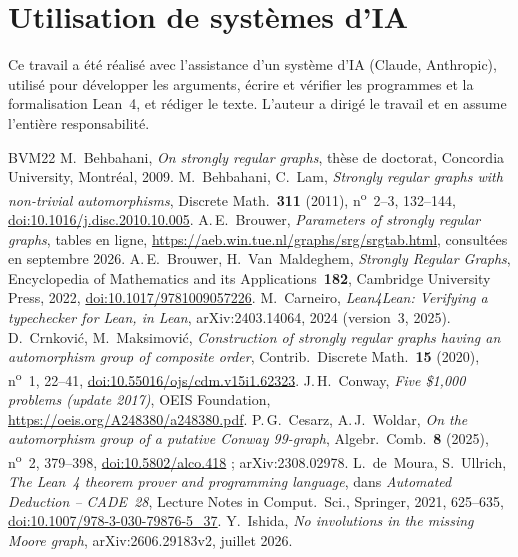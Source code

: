 \documentclass[11pt,a4paper]{article}
\theoremstyle{remark}
\begin{document}
{\small\raggedright
\section*{Utilisation de systèmes d'IA}
Ce travail a été réalisé avec l'assistance d'un système d'IA (Claude, Anthropic), utilisé pour développer les
arguments, écrire et vérifier les programmes et la formalisation Lean~4, et rédiger le texte. L'auteur a dirigé le
travail et en assume l'entière responsabilité.

\begin{thebibliography}{BVM22}
 M.~Behbahani, \emph{On strongly regular graphs}, thèse de doctorat, Concordia University, Montréal, 2009.
 M.~Behbahani, C.~Lam, \emph{Strongly regular graphs with non-trivial automorphisms}, Discrete Math.\
\textbf{311} (2011), n\textsuperscript{o}~2--3, 132--144,
\href{https://doi.org/10.1016/j.disc.2010.10.005}{doi:10.1016/j.disc.2010.10.005}.
\bibitem[Br]{Br} A.\,E.~Brouwer, \emph{Parameters of strongly regular graphs}, tables en ligne,
\url{https://aeb.win.tue.nl/graphs/srg/srgtab.html}, consultées en septembre 2026.
\bibitem[BVM22]{BVM22} A.\,E.~Brouwer, H.~Van~Maldeghem, \emph{Strongly Regular Graphs}, Encyclopedia of Mathematics and its
Applications~\textbf{182}, Cambridge University Press, 2022,
\href{https://doi.org/10.1017/9781009057226}{doi:10.1017/9781009057226}.
\bibitem[Car24]{Car24} M.~Carneiro, \emph{Lean4Lean: Verifying a typechecker for Lean, in Lean}, arXiv:2403.14064, 2024
(version~3, 2025).
 D.~Crnković, M.~Maksimović, \emph{Construction of strongly regular graphs having an automorphism group of
composite order}, Contrib.\ Discrete Math.\ \textbf{15} (2020), n\textsuperscript{o}~1, 22--41,
\href{https://doi.org/10.55016/ojs/cdm.v15i1.62323}{doi:10.55016/ojs/cdm.v15i1.62323}.
\bibitem[Co]{Co} J.\,H.~Conway, \emph{Five \$1,000 problems (update 2017)}, OEIS Foundation,
\url{https://oeis.org/A248380/a248380.pdf}.
 P.\,G.~Cesarz, A.\,J.~Woldar, \emph{On the automorphism group of a putative Conway 99-graph}, Algebr.\
Comb.\ \textbf{8} (2025), n\textsuperscript{o}~2, 379--398, \href{https://doi.org/10.5802/alco.418}{doi:10.5802/alco.418} ;
arXiv:2308.02978.
\bibitem[dMU21]{dMU21} L.~de~Moura, S.~Ullrich, \emph{The Lean~4 theorem prover and programming language}, dans
\emph{Automated Deduction -- CADE~28}, Lecture Notes in Comput.\ Sci., Springer, 2021, 625--635,
\href{https://doi.org/10.1007/978-3-030-79876-5_37}{doi:10.1007/978-3-030-79876-5\_37}.
\bibitem[I26]{I26} Y.~Ishida, \emph{No involutions in the missing Moore graph}, arXiv:2606.29183v2, juillet 2026.

\end{thebibliography}}
\end{document}
